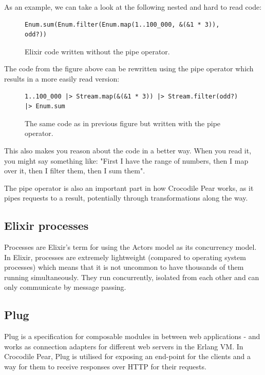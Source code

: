 \documentclass{cslthse-msc}
\begin{document}
As an example, we can take a look at the following nested and hard to read code:

\begin{figure}[H]
  \centering
\begin{lstlisting}[breaklines=true,frame=single]
Enum.sum(Enum.filter(Enum.map(1..100_000, &(&1 * 3)), odd?))
\end{lstlisting}
  \caption{Elixir code written without the pipe operator.}
\end{figure}

The code from the figure above can be rewritten using the pipe operator which results in a more easily read version:

\begin{figure}[H]
  \centering
\begin{lstlisting}[breaklines=true,frame=single]
1..100_000 |> Stream.map(&(&1 * 3)) |> Stream.filter(odd?) |> Enum.sum
\end{lstlisting}
  \caption{The same code as in previous figure but written with the pipe operator.}
\end{figure}

This also makes you reason about the code in a better way. When you read it, you might say something like: "First I have the range of numbers, then I map over it, then I filter them, then I sum them".

The pipe operator is also an important part in how Crocodile Pear works, as it pipes requests to a result, potentially through transformations along the way.

\subsection{Elixir processes}
Processes are Elixir's term for using the Actors model as its concurrency model. In Elixir, processes are extremely lightweight (compared to operating system processes) which means that it is not uncommon to have thousands of them running simultaneously. They run concurrently, isolated from each other and can only communicate by message passing\cite{elixir_processes}.

\subsection{Plug}
Plug is a specification for composable modules in between web applications - and works as connection adapters for different web servers in the Erlang VM\cite{plug}. In Crocodile Pear, Plug is utilised for exposing an end-point for the clients and a way for them to receive responses over HTTP for their requests.
\end{document}

